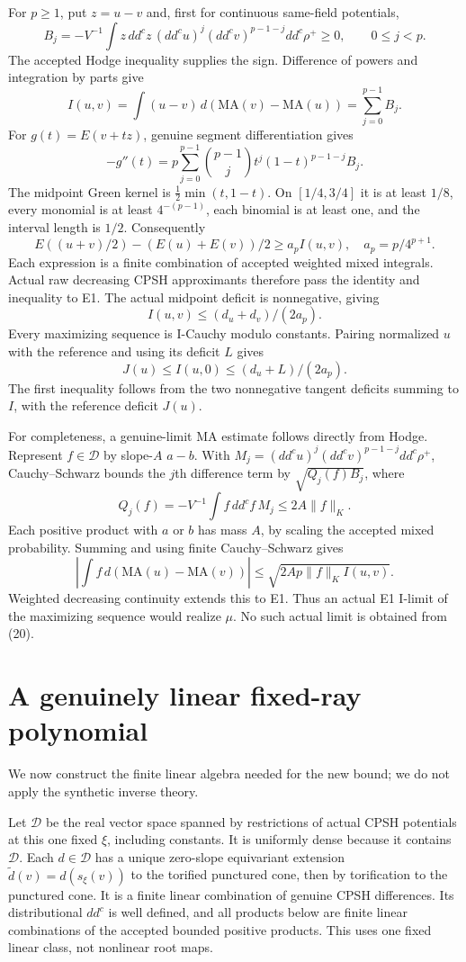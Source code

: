 \documentclass[
  10pt,
]{article}
\begin{document}
For \(p\ge1\), put \(z=u-v\) and, first for continuous same-field
potentials,
\[ B_j=-V^{-1}\int z\,dd^cz\,(dd^cu)^j(dd^cv)^{p-1-j}dd^c\rho^+\ge0,
 \qquad 0\le j<p. \tag{17}\] The accepted Hodge inequality supplies the
sign. Difference of powers and integration by parts give
\[ I(u,v)=\int(u-v)\,d(\mathrm{MA}(v)-\mathrm{MA}(u))=\sum_{j=0}^{p-1}B_j. \tag{18}\]
For \(g(t)=E(v+tz)\), genuine segment differentiation gives
\[-g''(t)=p\sum_{j=0}^{p-1}{p-1\choose j}t^j(1-t)^{p-1-j}B_j.\] The
midpoint Green kernel is \(\frac12\min(t,1-t)\). On \([1/4,3/4]\) it is
at least \(1/8\), every monomial is at least \(4^{-(p-1)}\), each
binomial is at least one, and the interval length is \(1/2\).
Consequently
\[E((u+v)/2)-(E(u)+E(v))/2\ge a_p I(u,v),\quad a_p=p/4^{p+1}. \tag{19}\]
Each expression is a finite combination of accepted weighted mixed
integrals. Actual raw decreasing CPSH approximants therefore pass the
identity and inequality to E1. The actual midpoint deficit is
nonnegative, giving \[ I(u,v)\le(d_u+d_v)/(2a_p). \tag{20}\] Every
maximizing sequence is I-Cauchy modulo constants. Pairing normalized
\(u\) with the reference and using its deficit \(L\) gives
\[ J(u)\le I(u,0)\le(d_u+L)/(2a_p). \tag{21}\] The first inequality
follows from the two nonnegative tangent deficits summing to \(I\), with
the reference deficit \(J(u)\).

For completeness, a genuine-limit MA estimate follows directly from
Hodge. Represent \(f\in\mathscr D\) by slope-\(A\) \(a-b\). With
\(M_j=(dd^cu)^j(dd^cv)^{p-1-j}dd^c\rho^+\), Cauchy--Schwarz bounds the
\(j\)th difference term by \(\sqrt{Q_j(f)B_j}\), where
\[Q_j(f)=-V^{-1}\int f\,dd^cf\,M_j\le2A\|f\|_K.\] Each positive product
with \(a\) or \(b\) has mass \(A\), by scaling the accepted mixed
probability. Summing and using finite Cauchy--Schwarz gives
\[ |\int f\,d(\mathrm{MA}(u)-\mathrm{MA}(v))|
 \le\sqrt{2Ap\|f\|_K I(u,v)}. \tag{22}\] Weighted decreasing continuity
extends this to E1. Thus an actual E1 I-limit of the maximizing sequence
would realize \(\mu\). No such actual limit is obtained from (20).

\section{A genuinely linear fixed-ray
polynomial}\label{a-genuinely-linear-fixed-ray-polynomial}

We now construct the finite linear algebra needed for the new bound; we
do not apply the synthetic inverse theory.

Let \(\mathcal D\) be the real vector space spanned by restrictions of
actual CPSH potentials at this one fixed \(\xi\), including constants.
It is uniformly dense because it contains \(\mathscr D\). Each
\(d\in\mathcal D\) has a unique zero-slope equivariant extension
\(\widetilde d(v)=d(s_\xi(v))\) to the torified punctured cone, then by
torification to the punctured cone. It is a finite linear combination of
genuine CPSH differences. Its distributional \(dd^c\) is well defined,
and all products below are finite linear combinations of the accepted
bounded positive products. This uses one fixed linear class, not
nonlinear root maps.
\end{document}
